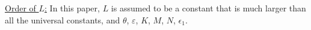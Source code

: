 \underline{Order of $L$:} In this paper, $L$ is assumed to be a constant that is much larger than all the universal constants, and $\theta$, $\varepsilon$, $K$, $M$, $N$, $\epsilon_1$. 








